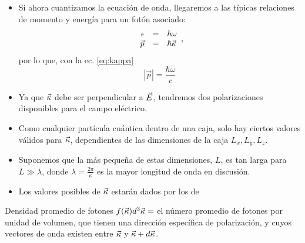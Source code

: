\documentclass{sintefbeamer}
\begin{document}
\begin{frame}
    \begin{itemize}
        \item Si ahora cuantizamos la ecuación de onda, llegaremos a las típicas relaciones de momento y energía para un fotón asociado:
        \begin{equation}
            \begin{array}{rcl}
                \epsilon &=& \hbar \omega  \\
                \Vec{p} &=& \hbar \Vec{\kappa} 
            \end{array},
            \label{eq:EMom}
        \end{equation}
        por lo que, con la ec. \ref{eq:kappa}
        \begin{equation}
            |\Vec{p}| = \frac{\hbar \omega}{c}
        \end{equation}\pause
        \item Ya que $\Vec{\kappa}$ debe ser perpendicular a $\Vec{E}$, tendremos dos polarizaciones disponibles para el campo eléctrico.
    \end{itemize}
\end{frame}

\begin{frame}
    \begin{itemize}
        \item Como cualquier partícula cuántica dentro de una caja, solo hay ciertos valores válidos para $\Vec{\kappa}$, dependientes de las dimensiones de la caja $L_x,L_y,L_z$.\pause
        \item Suponemos que la más pequeña de estas dimensiones, $L$, es tan larga para $L \gg \lambda$, donde $\lambda = \frac{2\pi}{\kappa}$ es la mayor longitud de onda en discusión.\pause
        \item Los valores posibles de $\Vec{\kappa}$ estarán dados por los de
    \end{itemize}\pause
    \begin{block}{Densidad promedio de fotones}
        $f(\Vec{\kappa})d^3\Vec{\kappa} =$ el número promedio de fotones por unidad de volumen, que tienen una dirección específica de polarización, y cuyos vectores de onda existen entre $\Vec{\kappa}$ y $\Vec{\kappa}+d\Vec{\kappa}$.
    \end{block}
\end{frame}
\end{document}
